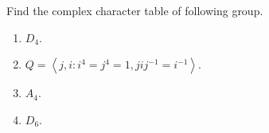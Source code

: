 \documentclass{ctexart}
\newif\ifpreface
\begin{document}
\large
\setlength{\baselineskip}{1.2em}
\ifpreface
	
	\newgeometry{left=2cm,right=2cm,top=2cm,bottom=2cm}
\else
	\maketitle
\fi
\begin{problem}
Find the complex character table of following group.
\begin{enumerate}
	\item \(D_4\).
	\item \(Q=\left\langle j,i:i^4=j^4=1,jij^{-1}=i^{-1}\right\rangle \).
	\item \(A_4\).
	\item \(D_6\).
\end{enumerate}
\end{problem}
\end{document}
